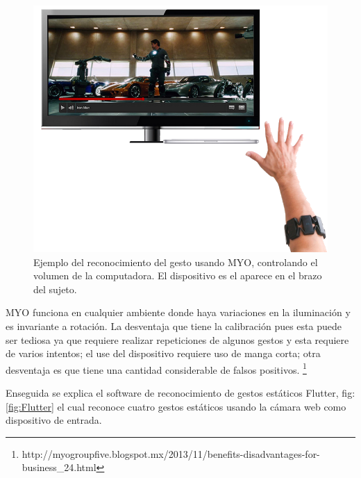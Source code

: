 \begin{figure}[h!]
\begin{center}
\includegraphics[scale=.5]{./Figures/MYO.png}
\end{center}
\caption{Ejemplo del reconocimiento del gesto usando MYO, controlando el volumen de la computadora. El dispositivo es el aparece en el brazo del sujeto.}
\label{fig:Myo}
\end{figure}

MYO funciona en cualquier ambiente donde haya variaciones en la iluminación y es invariante a rotación. La desventaja que tiene la calibración pues esta puede ser tediosa ya que requiere realizar repeticiones de algunos gestos y esta requiere de varios intentos; el use del dispositivo requiere uso de manga corta; otra desventaja es que tiene una cantidad considerable de falsos positivos. \footnote{http://myogroupfive.blogspot.mx/2013/11/benefits-disadvantages-for-business_24.html} 


Enseguida se explica el software de reconocimiento de gestos estáticos Flutter, fig:\ref{fig:Flutter} el cual reconoce cuatro gestos estáticos usando la cámara web como dispositivo de entrada. 

